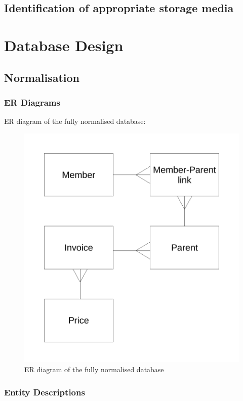 \subsection{Identification of appropriate storage media}

\section{Database Design}

\subsection{Normalisation}

\subsubsection{ER Diagrams}

ER diagram of the fully normalised database:
\begin{figure}[H]
\includegraphics[width=\textwidth]{./Design/images/ER_diagram_design.pdf}
    \caption{ER diagram of the fully normalised database} \label{fig:ER_diagram_design}
\end{figure}


\subsubsection{Entity Descriptions}


